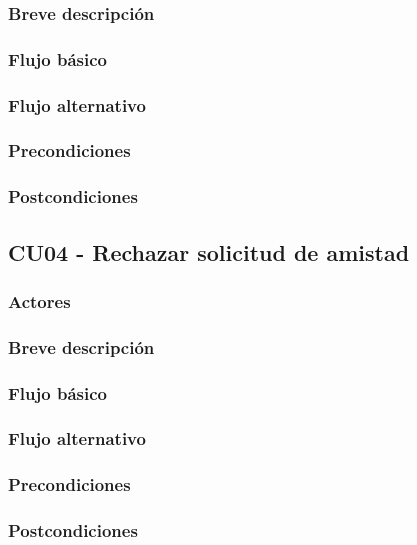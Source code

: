 \documentclass[12pt, a4paper, titlepage]{article}
\begin{document}
\subsubsection{Breve descripción}
\subsubsection{Flujo básico}
\subsubsection{Flujo alternativo}
\subsubsection{Precondiciones}
\subsubsection{Postcondiciones}


\subsection{CU04 - Rechazar solicitud de amistad}
\subsubsection{Actores}
\subsubsection{Breve descripción}
\subsubsection{Flujo básico}
\subsubsection{Flujo alternativo}
\subsubsection{Precondiciones}
\subsubsection{Postcondiciones}

\end{document}
